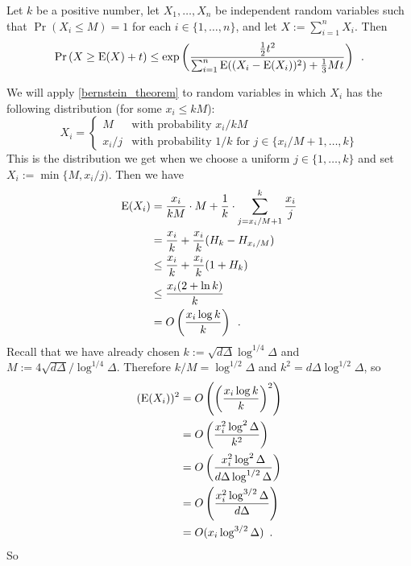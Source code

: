 \documentclass{patmorin}
\begin{document}
\begin{thm}\label{bernstein_theorem}
  Let $k$ be a positive number, let $X_1,\ldots,X_n$ be independent random variables such that $\Pr(X_i\le M)=1$ for each $i\in\{1,\ldots,n\}$, and let $X:=\sum_{i=1}^n X_i$. Then
  \begin{equation}
    \Pr\left(X \ge \mathrm{E}(X)+ t\right)
      \le \exp\left(\frac{\tfrac{1}{2}t^2}{\sum_{i=1}^n \mathrm{E}((X_i-\mathrm{E}(X_i))^2)+\tfrac{1}{3}Mt}\right) \enspace . \label{bernstein}
  \end{equation}
\end{thm}
We will apply \cref{bernstein_theorem} to random variables in which $X_i$ has the following distribution (for some $x_i\le kM$):
\[
  X_i = \begin{cases}
          M & \text{with probability $x_i/kM$} \\
          x_i/j & \text{with probability $1/k$ for $j\in\{x_i/M+1,\ldots,k\}$}
        \end{cases}
\]
This is the distribution we get when we choose a uniform $j\in\{1,\ldots,k\}$ and set $X_i:=\min\{M,x_i/j)$.
Then we have
\begin{align*}
  \mathrm{E}(X_i)
  & =\frac{x_i}{kM}\cdot M + \frac{1}{k}\cdot\sum_{j=x_i/M+1}^k \frac{x_i}{j} \\
  & = \frac{x_i}{k} + \frac{x_i}{k}(H_{k}-H_{x_i/M}) \\
  & \le \frac{x_i}{k} + \frac{x_i}{k}(1+H_{k}) \\
  & \le \frac{x_i(2+\ln k)}{k} \\
  & = O\left(\frac{x_i\log k}{k}\right) \enspace .
\end{align*}
Recall that we have already chosen $k:=\sqrt{d\Delta}\log^{1/4}\Delta$ and $M:=4\sqrt{d\Delta}/\log^{1/4}\Delta$.  Therefore $k/M=\log^{1/2}\Delta$ and $k^2=d\Delta\log^{1/2}\Delta$, so
\begin{align*}
  (\mathrm{E}(X_i))^2
  & = O\left(\left(\frac{x_i\log k}{k}\right)^2\right) \\
  & = O\left(\frac{x_i^2\log^2 \Delta}{k^2}\right) \\
  & = O\left(\frac{x_i^2\log^2 \Delta}{d\Delta\log^{1/2}\Delta}\right) \\
  & = O\left(\frac{x_i^2\log^{3/2} \Delta}{d\Delta}\right) \\
  & = O(x_i\log^{3/2} \Delta)
  \enspace .
\end{align*}
So
\end{document}
